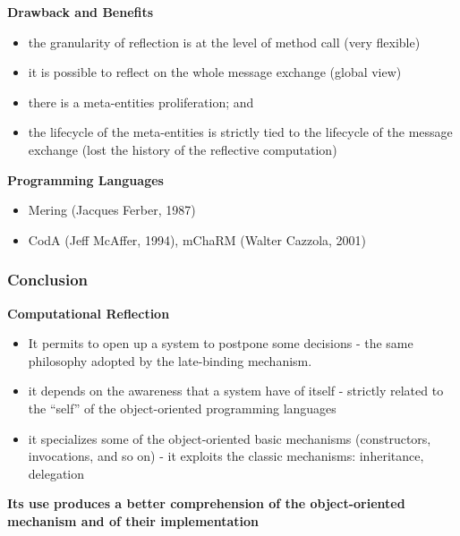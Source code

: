 \textbf{Drawback and Benefits}
\begin{itemize}
	\item the granularity of reflection is at the level of method call (very flexible)
	\item it is possible to reflect on the whole message exchange (global view)
	\item there is a meta-entities proliferation; and
	\item the lifecycle of the meta-entities is strictly tied to the lifecycle of the message exchange (lost the history of the reflective computation)
\end{itemize}

\textbf{Programming Languages}
\begin{itemize}
	\item Mering (Jacques Ferber, 1987)
	\item  CodA (Jeff McAffer, 1994), mChaRM (Walter Cazzola, 2001)
\end{itemize}

\subsubsection{Conclusion}
\textbf{Computational Reflection}
\begin{itemize}
	\item It permits to open up a system to postpone some decisions
	- the same philosophy adopted by the late-binding mechanism.
	\item it depends on the awareness that a system have of itself
	- strictly related to the “self” of the object-oriented programming languages
	\item it specializes some of the object-oriented basic mechanisms (constructors, invocations, and so on)
	- it exploits the classic mechanisms: inheritance, delegation
\end{itemize}

\textbf{Its use produces a better comprehension of the object-oriented mechanism and of their implementation}